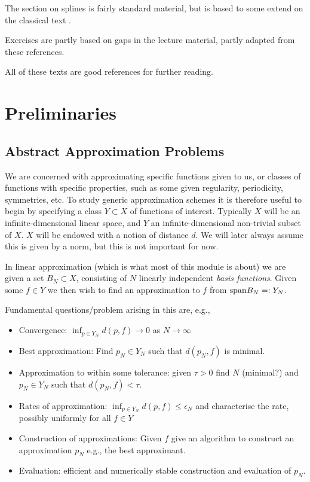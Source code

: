 The section on splines is fairly standard material, but is based to some extend
on the classical text \cite{Powell1981-bg}.

Exercises are partly based on gaps in the lecture material, partly adapted from
these references.

All of these texts are good references for further reading.

\section{Preliminaries}
%
\label{sec:prelims}
%

\subsection{Abstract Approximation Problems}
%
We are concerned with approximating specific functions given to us, or classes
of functions with specific properties, such as some given regularity,
periodicity, symmetries, etc. To study generic approximation schemes it is
therefore useful to begin by specifying a class $Y \subset X$ of functions of
interest. Typically $X$ will be an infinite-dimensional linear space,  and $Y$
an infinite-dimensional non-trivial subset of $X$. $X$ will be endowed with
a notion of distance $d$. We will later always assume this is given by a norm,
but this is not important for now.

In linear approximation (which is what most of this module is about)
we are given a set $B_N \subset X$, consisting of $N$ linearly independent
{\em basis functions}. Given some $f \in Y$ we then wish to find
an approximation to $f$ from ${\rm span} B_N =: Y_N$.

Fundamental questions/problem arising in this are, e.g.,
\begin{itemize}
\item Convergence: $\inf_{p \in Y_N} d(p, f) \to 0$ as $N \to \infty$
\item Best approximation: Find $p_N \in Y_N$ such that $d(p_N, f)$ is minimal.
\item Approximation to within some tolerance: given $\tau > 0$ find $N$ (minimal?)
  and $p_N \in Y_N$ such that $d(p_N, f) < \tau$.
\item Rates of approximation: $\inf_{p \in Y_N} d(p, f) \leq \epsilon_N$
  and characterise the rate, possibly uniformly for all $f \in Y$
\item Construction of approximations: Given $f$ give an algorithm to
  construct an approximation $p_N$ e.g., the best approximant.
\item Evaluation: efficient and numerically stable construction and
  evaluation of $p_N$.
\end{itemize}

